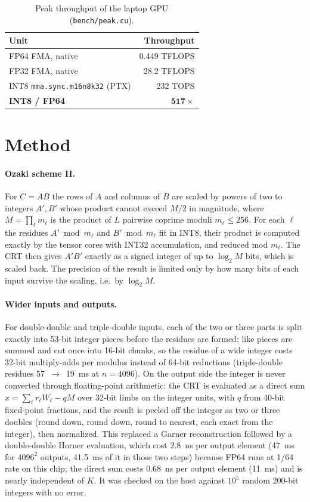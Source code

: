 \documentclass[11pt]{article}
\begin{document}
\begin{table}[t]\centering
\caption{Peak throughput of the laptop GPU (\texttt{bench/peak.cu}).}\label{tab:peak}
\begin{tabular}{lr}\toprule
Unit & Throughput \\\midrule
FP64 FMA, native & 0.449 TFLOPS \\
FP32 FMA, native & 28.2 TFLOPS \\
INT8 \texttt{mma.sync.m16n8k32} (PTX) & 232 TOPS \\
\textbf{INT8 / FP64} & $\mathbf{517\times}$ \\\bottomrule
\end{tabular}
\end{table}

\section{Method}\label{sec:method}
\paragraph{Ozaki scheme II.} For $C=AB$ the rows of $A$ and columns of $B$ are scaled by powers of two to integers
$A',B'$ whose product cannot exceed $M/2$ in magnitude, where $M=\prod_\ell m_\ell$ is the product of $L$ pairwise coprime
moduli $m_\ell\le 256$. For each $\ell$ the residues $A'\bmod m_\ell$ and $B'\bmod m_\ell$ fit in INT8, their product is
computed exactly by the tensor cores with INT32 accumulation, and reduced mod $m_\ell$. The CRT then gives
$A'B'$ exactly as a signed integer of up to $\log_2 M$ bits, which is scaled back. The precision of the result is
limited only by how many bits of each input survive the scaling, i.e.\ by $\log_2 M$.

\paragraph{Wider inputs and outputs.} For double-double and triple-double inputs, each of the two or three parts is split
exactly into 53-bit integer pieces before the residues are formed; like pieces are summed and cut once into 16-bit chunks,
so the residue of a wide integer costs 32-bit multiply-adds per modulus instead of 64-bit reductions (triple-double residues
57~$\to$~19~ms at $n=4096$). On the output side the integer is never converted through floating-point arithmetic: the CRT is
evaluated as a direct sum $x=\sum_\ell r_\ell W_\ell - qM$ over 32-bit limbs on the integer units, with $q$ from 40-bit
fixed-point fractions, and the result is peeled off the integer as two or three doubles (round down, round down, round to
nearest, each exact from the integer), then normalized. This replaced a Garner reconstruction followed by a double-double
Horner evaluation, which cost 2.8~ns per output element (47~ms for $4096^2$ outputs, 41.5~ms of it in those two steps)
because FP64 runs at 1/64 rate on this chip; the direct sum costs 0.68~ns per output element (11~ms) and is nearly
independent of $K$. It was checked on the host
against $10^5$ random 200-bit integers with no error.
\end{document}
